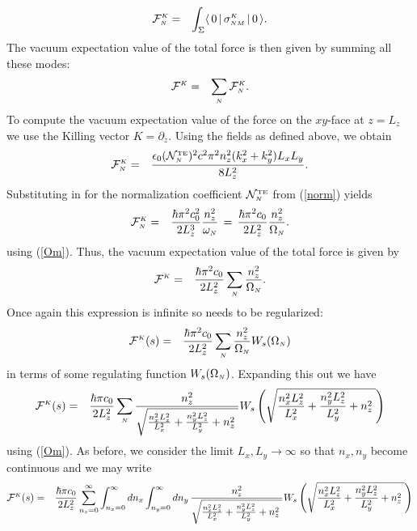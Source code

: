 \documentclass[sections]{tjwNOTES}
\newcommand\man[1]{\mathcal{#1}}
\newcommand\kx{k_{x}}
\newcommand\ky{k_{y}}
\newcommand\nx{n_{x}}
\newcommand\ny{n_{y}}
\newcommand\nz{n_{z}}
\newcommand\Lx{L_{x}}
\newcommand\Ly{L_{y}}
\newcommand\Lz{L_{z}}
\newcommand\N{\mbox{\tiny $N$}}
\renewcommand\M{\mbox{\tiny $M$}}
\newcommand\K{\mbox{\tiny $K$}}
\newcommand\TE{\mbox{\tiny TE}}
\newcommand\VEV[1]{ \langle \, 0 \, | \, #1 \,| \, 0 \, \rangle }
\begin{document}
\begin{eqnarray*}
    \man{F}^{\K}_{\N} &=& \int_{\Sigma}\VEV{\sigma^{\K}_{\N\M} } .
\end{eqnarray*}
The vacuum expectation value of the total force is then given by summing all these modes:
\begin{eqnarray*}
    \man{F}^{\K} &=& \sum_{\N} \man{F}^{\K}_{\N}  .
\end{eqnarray*}
To compute the vacuum expectation value of the force on the $xy$-face at $z=\Lz$ we use the Killing vector $K=\partial_{z}$. Using the fields as defined above, we obtain
\begin{eqnarray*}
   \man{F}^{\K}_{\N} &=& \frac{\epsilon_{0}(\man{N}^{\TE}_{\N})^{2}c^{2}\pi^{2}\nz^{2}(\kx^{2}+\ky^{2})\Lx\Ly}{8\Lz^{2}}.
\end{eqnarray*}
Substituting in for the normalization coefficient $\man{N}^{\TE}_{\N}$ from (\ref{norm}) yields
\begin{eqnarray*}
   \man{F}^{\K}_{\N} &=& \frac{\hbar\pi^{2}c_{0}^{2}}{2\Lz^{3}} \frac{\nz^{2}}{\omega_{\N}} \,=\,  \frac{\hbar\pi^{2}c_{0}}{2\Lz^{2}} \frac{\nz^{2}}{\Omega_{\N}} .
\end{eqnarray*}
using (\ref{Om}). Thus, the vacuum expectation value of the total force is given by
\begin{eqnarray*}
    \man{F}^{\K} &=& \frac{\hbar\pi^{2}c_{0}}{2\Lz^{2}} \sum_{\N} \frac{\nz^{2}}{\Omega_{\N}}.
\end{eqnarray*}
Once again this expression is infinite so needs to be regularized:
\begin{eqnarray*}
    \man{F}^{\K}(s) &=& \frac{\hbar\pi^{2}c_{0}}{2\Lz^{2}} \sum_{\N} \frac{\nz^{2}}{\Omega_{\N}}W_{s}(\Omega_{\N})
\end{eqnarray*}
in terms of some regulating function $W_{s}(\Omega_{\N})$. Expanding this out we have
\begin{eqnarray*}
    \man{F}^{\K}(s) &=& \frac{\hbar\pi c_{0}}{2\Lz^{2}} \sum_{\N} \frac{\nz^{2}}{\sqrt{ \frac{\nx^{2}\Lz^{2}}{\Lx^{2}} + \frac{\ny^{2}\Lz^{2}}{\Ly^{2}} + \nz^{2} \;}}W_{s}\left(\sqrt{ \frac{\nx^{2}\Lz^{2}}{\Lx^{2}} + \frac{\ny^{2}\Lz^{2}}{\Ly^{2}} + \nz^{2} \;}\right)
\end{eqnarray*}
using (\ref{Om}). As before, we consider the limit $\Lx,\Ly\rightarrow\infty$ so that $\nx,\ny$ become continuous and we may write
\begin{eqnarray*}
    \man{F}^{\K}(s) &=& \frac{\hbar\pi c_{0}}{2\Lz^{2}} \sum_{\nz=0}^{\infty} \int_{\nx=0}^{\infty}d\nx\int_{\ny=0}^{\infty}d\ny \,\frac{\nz^{2}}{\sqrt{ \frac{\nx^{2}\Lz^{2}}{\Lx^{2}} + \frac{\ny^{2}\Lz^{2}}{\Ly^{2}} + \nz^{2} \;}}W_{s}\left(\sqrt{ \frac{\nx^{2}\Lz^{2}}{\Lx^{2}} + \frac{\ny^{2}\Lz^{2}}{\Ly^{2}} + \nz^{2} \;}\right)
\end{eqnarray*}
\end{document}
